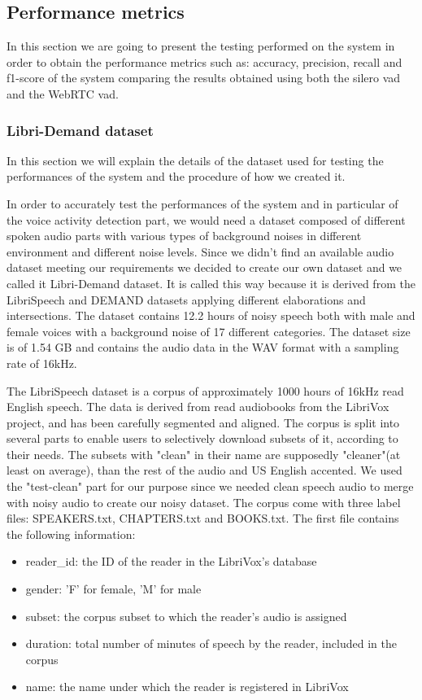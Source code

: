 \documentclass[../main.tex]{subfiles}
\begin{document}
\subsection{Performance metrics}

In this section we are going to present the testing performed on the system in order to obtain the performance metrics such as: accuracy, precision, recall and f1-score of the system comparing the results obtained using both the silero vad and the WebRTC vad.

\subsubsection{Libri-Demand dataset}

In this section we will explain the details of the dataset used for testing the performances of the system and the procedure of how we created it.

In order to accurately test the performances of the system and in particular of the voice activity detection part, we would need a dataset composed of different spoken audio parts with various types of background noises in different environment and different noise levels. Since we didn't find an available audio dataset meeting our requirements we decided to create our own dataset and we called it Libri-Demand dataset. It is called this way because it is derived from the LibriSpeech and DEMAND datasets applying different elaborations and intersections. The dataset contains 12.2 hours of noisy speech both with male and female voices with a background noise of 17 different categories. The dataset size is of 1.54 GB and contains the audio data in the WAV format with a sampling rate of 16kHz.

The LibriSpeech dataset is a corpus of approximately 1000 hours of 16kHz read English speech. The data is derived from read audiobooks from the LibriVox project, and has been carefully segmented and aligned. The corpus is split into several parts to enable users to selectively download subsets of it, according to their needs. The subsets with "clean" in their name are supposedly "cleaner"(at least on average), than the rest of the audio and US English accented. We used the "test-clean" part for our purpose since we needed clean speech audio to merge with noisy audio to create our noisy dataset. The corpus come with three label files: SPEAKERS.txt, CHAPTERS.txt and BOOKS.txt. The first file contains the following information:

\begin{itemize}
    \item reader\_id: the ID of the reader in the LibriVox's database
    \item gender: 'F' for female, 'M' for male
    \item subset: the corpus subset to which the reader's audio is assigned
    \item duration: total number of minutes of speech by the reader, included in the corpus
    \item name: the name under which the reader is registered in LibriVox
\end{itemize}
\end{document}
